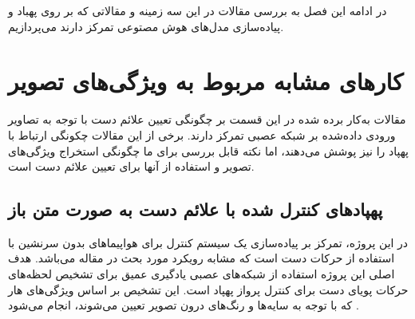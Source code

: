 در ادامه این فصل به بررسی مقالات در این سه زمینه و مقالاتی که بر روی پهباد و پیاده‌سازی مدل‌های هوش مصتوعی تمرکز دارند می‌پردازیم.

\section{کارهای مشابه مربوط به ویژگی‌های تصویر}
مقالات به‌کار برده شده در این قسمت بر چگونگی تعیین علائم دست با توجه به تصاویر ورودی داده‌شده بر شبکه عصبی تمرکز دارند. برخی از این مقالات چکونگی ارتباط با پهپاد را نیز پوشش می‌دهند، اما نکته قابل بررسی برای ما چگونگی استخراج ویژگی‌های تصویر و استفاده از آنها برای تعیین علائم دست است.


\subsection {پهپاد‌های کنترل شده با علائم دست به صورت متن باز}
در این پروژه، تمرکز بر پیاده‌سازی یک سیستم کنترل برای هواپیماهای بدون سرنشین با استفاده از حرکات دست است که مشابه رویکرد مورد بحث در مقاله می‌باشد.
هدف اصلی این پروژه استفاده از شبکه‌های عصبی یادگیری عمیق برای تشخیص لحظه‌های حرکات پویای دست برای کنترل پرواز پهپاد 
است. این تشخیص بر اساس ویژگی‌های هار 
 که با توجه به سایه‌ها و رنگ‌های درون تصویر تعیین می‌شوند، انجام می‌شود \cite{natarajan2018hand}.


